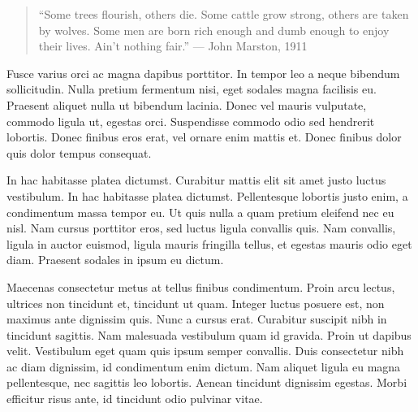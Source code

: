 \documentclass[a4paper]{tufte-handout} %
\begin{document}
\begin{quote}
	``Some trees flourish, others die. Some cattle grow strong, others are taken by wolves. Some men are born rich enough and dumb enough to enjoy their lives. Ain't nothing fair.'' --- John Marston, 1911
\end{quote}

Fusce varius orci ac magna dapibus porttitor. In tempor leo a neque bibendum sollicitudin. Nulla pretium fermentum nisi, eget sodales magna facilisis eu. Praesent aliquet nulla ut bibendum lacinia. Donec vel mauris vulputate, commodo ligula ut, egestas orci. Suspendisse commodo odio sed hendrerit lobortis. Donec finibus eros erat, vel ornare enim mattis et. Donec finibus dolor quis dolor tempus consequat.

In hac habitasse platea dictumst. Curabitur mattis elit sit amet justo luctus vestibulum. In hac habitasse platea dictumst. Pellentesque lobortis justo enim, a condimentum massa tempor eu. Ut quis nulla a quam pretium eleifend nec eu nisl. Nam cursus porttitor eros, sed luctus ligula convallis quis. Nam convallis, ligula in auctor euismod, ligula mauris fringilla tellus, et egestas mauris odio eget diam. Praesent sodales in ipsum eu dictum.

Maecenas consectetur metus at tellus finibus condimentum. Proin arcu lectus, ultrices non tincidunt et, tincidunt ut quam. Integer luctus posuere est, non maximus ante dignissim quis. Nunc a cursus erat. Curabitur suscipit nibh in tincidunt sagittis. Nam malesuada vestibulum quam id gravida. Proin ut dapibus velit. Vestibulum eget quam quis ipsum semper convallis. Duis consectetur nibh ac diam dignissim, id condimentum enim dictum. Nam aliquet ligula eu magna pellentesque, nec sagittis leo lobortis. Aenean tincidunt dignissim egestas. Morbi efficitur risus ante, id tincidunt odio pulvinar vitae.

\end{document}
